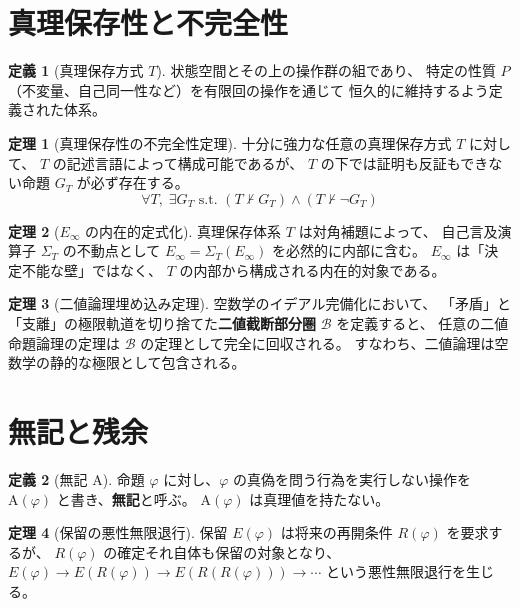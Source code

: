 \documentclass[11pt,a4paper]{ltjsarticle}
\newcommand{\Einfty}{E_\infty}
\newcommand{\Bval}{\mathcal{B}}
\newcommand{\SelfRef}{\Sigma}
\theoremstyle{definition}
\newtheorem{definition}{定義}[section]
\newtheorem{theorem}{定理}[section]
\begin{document}
\section{真理保存性と不完全性}

\begin{definition}[真理保存方式 $T$]
状態空間とその上の操作群の組であり、
特定の性質 $P$（不変量、自己同一性など）を有限回の操作を通じて
恒久的に維持するよう定義された体系。
\end{definition}

\begin{theorem}[真理保存性の不完全性定理]
十分に強力な任意の真理保存方式 $T$ に対して、
$T$ の記述言語によって構成可能であるが、
$T$ の下では証明も反証もできない命題 $G_T$ が必ず存在する。
\[
\forall T,\; \exists G_T \text{ s.t. } (T \nvdash G_T) \land (T \nvdash \neg G_T)
\]
\end{theorem}

\begin{theorem}[$\Einfty$ の内在的定式化]
真理保存体系 $T$ は対角補題によって、
自己言及演算子 $\SelfRef_T$ の不動点として
$\Einfty = \SelfRef_T(\Einfty)$ を必然的に内部に含む。
$\Einfty$ は「決定不能な壁」ではなく、
$T$ の内部から構成される内在的対象である。
\end{theorem}

\begin{theorem}[二値論理埋め込み定理]
空数学のイデアル完備化において、
「矛盾」と「支離」の極限軌道を切り捨てた\textbf{二値截断部分圏} $\Bval$ を定義すると、
任意の二値命題論理の定理は $\Bval$ の定理として完全に回収される。
すなわち、二値論理は空数学の静的な極限として包含される。
\end{theorem}

\section{無記と残余}

\begin{definition}[無記 $\mathrm{A}$]
命題 $\varphi$ に対し、$\varphi$ の真偽を問う行為を実行しない操作を
$\mathrm{A}(\varphi)$ と書き、\textbf{無記}と呼ぶ。
$\mathrm{A}(\varphi)$ は真理値を持たない。
\end{definition}

\begin{theorem}[保留の悪性無限退行]
保留 $E(\varphi)$ は将来の再開条件 $R(\varphi)$ を要求するが、
$R(\varphi)$ の確定それ自体も保留の対象となり、
$E(\varphi) \to E(R(\varphi)) \to E(R(R(\varphi))) \to \cdots$
という悪性無限退行を生じる。
\end{theorem}
\end{document}
